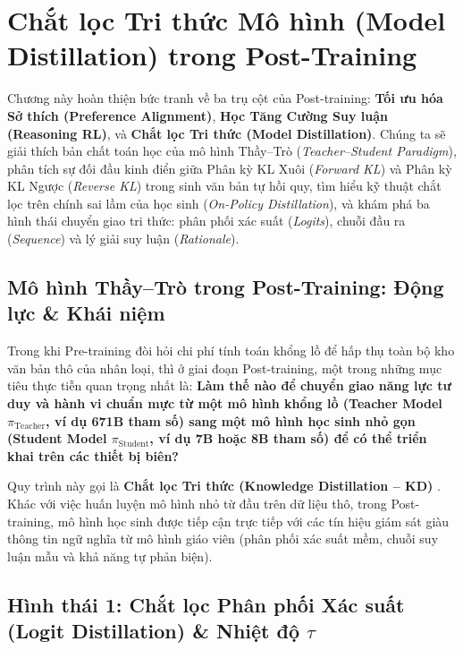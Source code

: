 \chapter{Chắt lọc Tri thức Mô hình (Model Distillation) trong Post-Training}
\label{chap:distillation}

\begin{pedagogy}
Chương này hoàn thiện bức tranh về ba trụ cột của Post-training: \textbf{Tối ưu hóa Sở thích (Preference Alignment)}, \textbf{Học Tăng Cường Suy luận (Reasoning RL)}, và \textbf{Chắt lọc Tri thức (Model Distillation)}. Chúng ta sẽ giải thích bản chất toán học của mô hình Thầy--Trò (\textit{Teacher--Student Paradigm}), phân tích sự đối đầu kinh điển giữa Phân kỳ KL Xuôi (\textit{Forward KL}) và Phân kỳ KL Ngược (\textit{Reverse KL}) trong sinh văn bản tự hồi quy, tìm hiểu kỹ thuật chắt lọc trên chính sai lầm của học sinh (\textit{On-Policy Distillation}), và khám phá ba hình thái chuyển giao tri thức: phân phối xác suất (\textit{Logits}), chuỗi đầu ra (\textit{Sequence}) và lý giải suy luận (\textit{Rationale}).
\end{pedagogy}

\section{Mô hình Thầy--Trò trong Post-Training: Động lực \& Khái niệm}
\label{sec:teacher_student}

Trong khi Pre-training đòi hỏi chi phí tính toán khổng lồ để hấp thụ toàn bộ kho văn bản thô của nhân loại, thì ở giai đoạn Post-training, một trong những mục tiêu thực tiễn quan trọng nhất là: \textbf{Làm thế nào để chuyển giao năng lực tư duy và hành vi chuẩn mực từ một mô hình khổng lồ (Teacher Model $\pi_{\text{Teacher}}$, ví dụ 671B tham số) sang một mô hình học sinh nhỏ gọn (Student Model $\pi_{\text{Student}}$, ví dụ 7B hoặc 8B tham số) để có thể triển khai trên các thiết bị biên?}

Quy trình này gọi là \textbf{Chắt lọc Tri thức (Knowledge Distillation -- KD)} \citep{hinton2015distilling}.
Khác với việc huấn luyện mô hình nhỏ từ đầu trên dữ liệu thô, trong Post-training, mô hình học sinh được tiếp cận trực tiếp với các tín hiệu giám sát giàu thông tin ngữ nghĩa từ mô hình giáo viên (phân phối xác suất mềm, chuỗi suy luận mẫu và khả năng tự phản biện).

\section{Hình thái 1: Chắt lọc Phân phối Xác suất (Logit Distillation) \& Nhiệt độ $\tau$}
\label{sec:logit_distillation}

